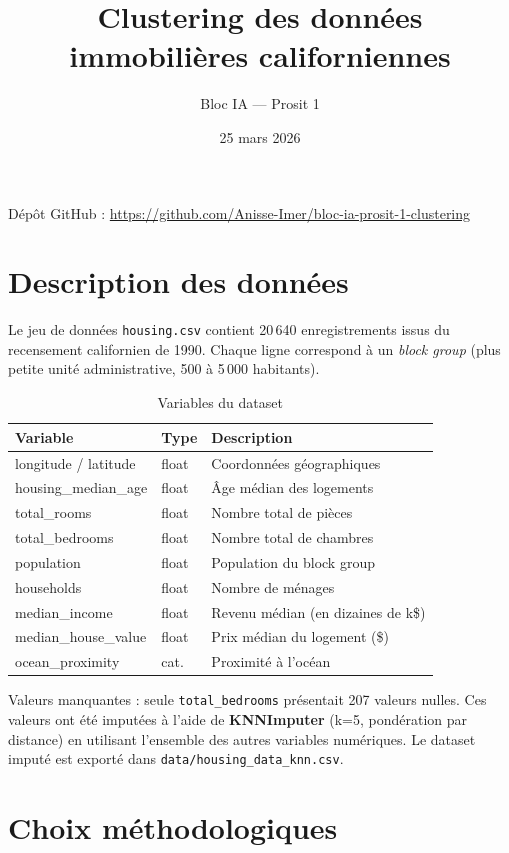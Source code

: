 \documentclass[11pt,a4paper]{article}
\title{Clustering des données immobilières californiennes}
\author{Bloc IA --- Prosit 1}
\date{25 mars 2026}
\begin{document}
\maketitle

\noindent Dépôt GitHub : \url{https://github.com/Anisse-Imer/bloc-ia-prosit-1-clustering}

\tableofcontents
\clearpage

\section{Description des données}

Le jeu de données \texttt{housing.csv} contient 20\,640 enregistrements issus du recensement californien de 1990. Chaque ligne correspond à un \textit{block group} (plus petite unité administrative, 500 à 5\,000 habitants).

\begin{table}[H]
\centering
\caption{Variables du dataset}
\begin{tabular}{lll}
\toprule
Variable & Type & Description \\
\midrule
longitude / latitude & float & Coordonnées géographiques \\
housing\_median\_age & float & Âge médian des logements \\
total\_rooms & float & Nombre total de pièces \\
total\_bedrooms & float & Nombre total de chambres \\
population & float & Population du block group \\
households & float & Nombre de ménages \\
median\_income & float & Revenu médian (en dizaines de k\$) \\
median\_house\_value & float & Prix médian du logement (\$) \\
ocean\_proximity & cat. & Proximité à l'océan \\
\bottomrule
\end{tabular}
\end{table}

Valeurs manquantes : seule \texttt{total\_bedrooms} présentait 207 valeurs nulles. Ces valeurs ont été imputées à l'aide de \textbf{KNNImputer} (k=5, pondération par distance) en utilisant l'ensemble des autres variables numériques. Le dataset imputé est exporté dans \texttt{data/housing\_data\_knn.csv}.

\section{Choix méthodologiques}
\end{document}

